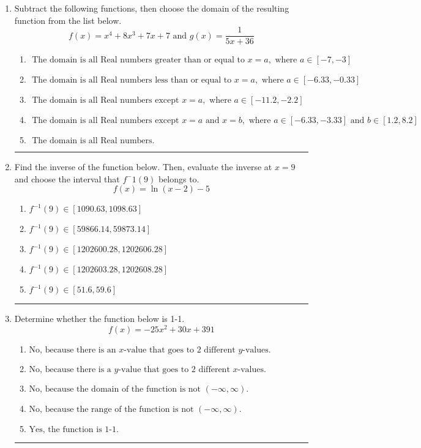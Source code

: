 \documentclass[14pt]{extbook}
\newcommand{\litem}[1]{\item#1\hspace*{-1cm}\rule{\textwidth}{0.4pt}}
\begin{document}
\begin{enumerate}
{\begin{enumerate}[label=\Alph*.]
\end{enumerate} }
\litem{
Subtract the following functions, then choose the domain of the resulting function from the list below.\[ f(x) = x^{4} +8 x^{3} +7 x + 7 \text{ and } g(x) = \frac{1}{5x+36} \]\begin{enumerate}[label=\Alph*.]
\item \( \text{ The domain is all Real numbers greater than or equal to } x = a, \text{ where } a \in [-7, -3] \)
\item \( \text{ The domain is all Real numbers less than or equal to } x = a, \text{ where } a \in [-6.33, -0.33] \)
\item \( \text{ The domain is all Real numbers except } x = a, \text{ where } a \in [-11.2, -2.2] \)
\item \( \text{ The domain is all Real numbers except } x = a \text{ and } x = b, \text{ where } a \in [-6.33, -3.33] \text{ and } b \in [1.2, 8.2] \)
\item \( \text{ The domain is all Real numbers. } \)

\end{enumerate} }
\litem{
Find the inverse of the function below. Then, evaluate the inverse at $x = 9$ and choose the interval that $f^-1(9)$ belongs to.\[ f(x) = \ln{(x-2)}-5 \]\begin{enumerate}[label=\Alph*.]
\item \( f^{-1}(9) \in [1090.63, 1098.63] \)
\item \( f^{-1}(9) \in [59866.14, 59873.14] \)
\item \( f^{-1}(9) \in [1202600.28, 1202606.28] \)
\item \( f^{-1}(9) \in [1202603.28, 1202608.28] \)
\item \( f^{-1}(9) \in [51.6, 59.6] \)

\end{enumerate} }
\litem{
Determine whether the function below is 1-1.\[ f(x) = -25 x^2 + 30 x + 391 \]\begin{enumerate}[label=\Alph*.]
\item \( \text{No, because there is an $x$-value that goes to 2 different $y$-values.} \)
\item \( \text{No, because there is a $y$-value that goes to 2 different $x$-values.} \)
\item \( \text{No, because the domain of the function is not $(-\infty, \infty)$.} \)
\item \( \text{No, because the range of the function is not $(-\infty, \infty)$.} \)
\item \( \text{Yes, the function is 1-1.} \)


\end{enumerate}}
\end{enumerate}
\end{document}

